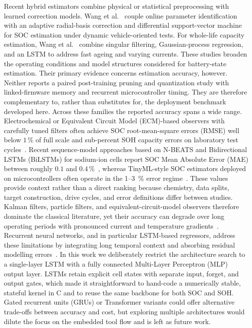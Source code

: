 \documentclass[final,3p,times]{elsarticle}
\begin{document}
Recent hybrid estimators combine physical or statistical preprocessing with learned correction models. Wang et al.~\cite{wang_improved_2024} couple online parameter identification with an adaptive radial-basis correction and differential support-vector machine for SOC estimation under dynamic vehicle-oriented tests. For whole-life capacity estimation, Wang et al.~\cite{wang_improved_2023} combine singular filtering, Gaussian-process regression, and an LSTM to address fast ageing and varying currents. These studies broaden the operating conditions and model structures considered for battery-state estimation. Their primary evidence concerns estimation accuracy, however. Neither reports a paired post-training pruning and quantization study with linked-firmware memory and recurrent microcontroller timing. They are therefore complementary to, rather than substitutes for, the deployment benchmark developed here.
Across these families the reported accuracy spans a wide range. Electrochemical or Equivalent Circuit Model (ECM)-based observers with carefully tuned filters often achieve SOC root-mean-square errors (RMSE) well below $1\,\%$ of full scale and sub-percent SOH capacity errors on laboratory test cycles~\cite{gaoCoEstimationStateofChargeStateof2022,gaoEnhancedStateofchargeEstimation2022,shenAlternativeCombinedCoestimation2022,wangFusionEstimationLithiumion2022}. Recent sequence-model approaches based on N-BEATS and Bidirectional LSTMs (BiLSTMs) for sodium-ion cells report SOC Mean Absolute Error (MAE) between roughly $0.1$ and $0.4\,\%$~\cite{sunStateChargeEstimation2023,sunStateofchargeEstimationSodiumion2024}, whereas TinyML-style SOC estimators deployed on microcontrollers often operate in the 1--3~\% error regime~\cite{crocioniLiIonBatteriesParameter2020,giazitzisCaseStudyTiny2024,Embedded_AI_only_SOC_mobile}. These values provide context rather than a direct ranking because chemistry, data splits, target construction, drive cycles, and error definitions differ between studies.
Kalman filters, particle filters, and equivalent-circuit-model observers therefore dominate the classical literature, yet their accuracy can degrade over long operating periods with pronounced current and temperature gradients~\cite{gaoEnhancedStateofchargeEstimation2022,wangFusionEstimationLithiumion2022}. Recurrent neural networks, and in particular LSTM-based regressors, address these limitations by integrating long temporal context and absorbing residual modelling errors~\cite{liOnlineCapacityEstimation2021,wangFusionEstimationLithiumion2022}. In this work we deliberately restrict the architecture search to a single-layer LSTM with a fully connected Multi-Layer Perceptron (MLP) output layer. LSTMs retain explicit cell states with separate input, forget, and output gates, which made it straightforward to hand-code a numerically stable, stateful kernel in C and to reuse the same backbone for both SOC and SOH. Gated recurrent units (GRUs) or Transformer variants could offer alternative trade-offs between accuracy and cost, but exploring multiple architectures would dilute the focus on the embedded tool flow and is left as future work.
\end{document}
